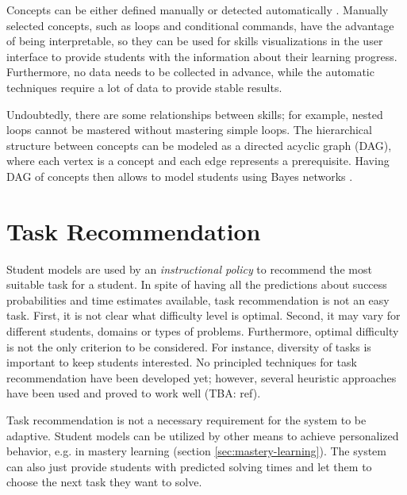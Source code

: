 Concepts can be either defined manually or detected automatically
  \cite{niznan-thesis}.  %
Manually selected concepts, such as loops and conditional commands,
  have the advantage of being interpretable,
  so they can be used for skills visualizations in the user interface
  to provide students with the information about their learning progress.
Furthermore, no data needs to be collected in advance,
  while the automatic techniques require a lot of data to provide stable results.  %


Undoubtedly, there are some relationships between skills;
  for example, nested loops cannot be mastered without mastering simple loops.
The hierarchical structure between concepts can be modeled
  as a directed acyclic graph (DAG),
  where each vertex is a concept and each edge represents a prerequisite.
Having DAG of concepts then allows to model students using Bayes networks
  \cite{its-programming}.


\section{Task Recommendation}
\label{sec:task-recommendation}

Student models are used by an \emph{instructional policy} to recommend
  the most suitable task for a student.
In spite of having all the predictions about success probabilities
  and time estimates available,
  task recommendation is not an easy task.
First, it is not clear what difficulty level is optimal.  %
Second, it may vary for different students, domains or types of problems.
Furthermore, optimal difficulty is not the only criterion to be considered.
For instance, diversity of tasks is important to keep students interested.
No principled techniques for task recommendation have been developed yet;
however, several heuristic approaches have been used
  and proved to work well (TBA: ref).

Task recommendation is not a necessary requirement
  for the system to be adaptive.
Student models can be utilized by other means to achieve personalized behavior,
  e.g. in mastery learning (section \ref{sec:mastery-learning}).
The system can also just provide students with predicted solving times
  and let them to choose the next task they want to solve.

